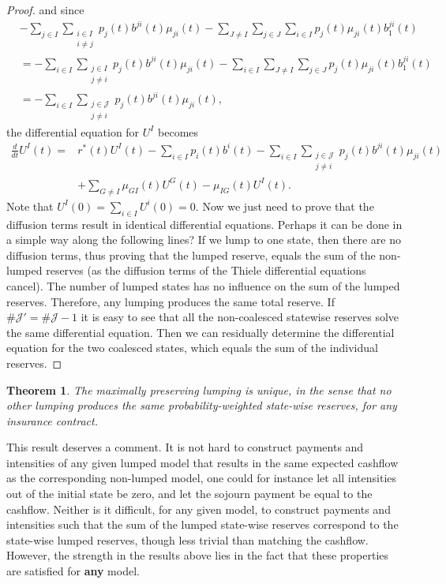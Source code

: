 \documentclass[12pt]{article}
\theoremstyle{my_thm}
\newtheorem{thm}{Theorem}[section]
\theoremstyle{my_def}
\theoremstyle{my_thm2}
\begin{document}
\begin{proof}
and since
\begin{align*}
&-\sum_{j \in I}  \sum_{ \substack{i \in I \\i \neq j}} p_j(t) b^{ji}(t) \mu_{ji}(t) 
-\sum_{J \neq I} \sum_{j \in J} \sum_{i \in I}p_j(t) \mu_{ji}(t)b_1^{ji}(t)
\\
&=
- \sum_{ i \in I} \sum_{\substack{j \in I \\j \neq i}}  p_j(t) b^{ji}(t) \mu_{ji}(t) 
- \sum_{i \in I} \sum_{J \neq I} \sum_{j \in J} p_j(t) \mu_{ji}(t)b_1^{ji}(t)
\\
&=
-\sum_{i \in I} \sum_{ \substack{j \in \mathcal{J} \\j \neq i}}p_j(t) b^{ji}(t) \mu_{ji}(t),
\end{align*}
the differential equation for $U^I$ becomes
\begin{align*}
\frac{d}{dt}U^I(t)=&r^*(t) U^I(t)-\sum_{i \in I} p_i(t)  b^i(t) 
-\sum_{i \in I} \sum_{ \substack{j \in \mathcal{J} \\j \neq i}}p_j(t) b^{ji}(t) \mu_{ji}(t)
\\
&+\sum_{G \neq I} \mu_{GI}(t) U^G(t)-\mu_{IG}(t)U^I(t).
\end{align*}
Note that $U^I(0)=\sum_{i \in I} U^i(0)=0$. Now we just need to prove that the diffusion terms result in identical differential equations. Perhaps it can be done in a simple way along the following lines? If we lump to one state, then there are no diffusion terms, thus proving that the lumped reserve, equals the sum of the non-lumped reserves (as the diffusion terms of the Thiele differential equations cancel). The number of lumped states has no influence on the sum of the lumped reserves. Therefore, any lumping produces the same total reserve. If $\#\mathcal{J}'=\#\mathcal{J}-1$ it is easy to see that all the non-coalesced statewise reserves solve the same differential equation. Then we can residually determine the differential equation for the two coalesced states, which equals the sum of the individual reserves.
\end{proof}

\begin{thm}
The maximally preserving lumping is unique, in the sense that no other lumping produces the same probability-weighted state-wise reserves, for any insurance contract.
\end{thm}

This result deserves a comment. It is not hard to construct payments and intensities of any given lumped model that results in the same expected cashflow as the corresponding non-lumped model, one could for instance let all intensities out of the initial state be zero, and let the sojourn payment be equal to the cashflow. Neither is it difficult, for any given model, to construct payments and intensities such that the sum of the lumped state-wise reserves correspond to the state-wise lumped reserves, though less trivial than matching the cashflow. However, the strength in the results above lies in the fact that these properties are satisfied for \textbf{any} model.
\end{document}
